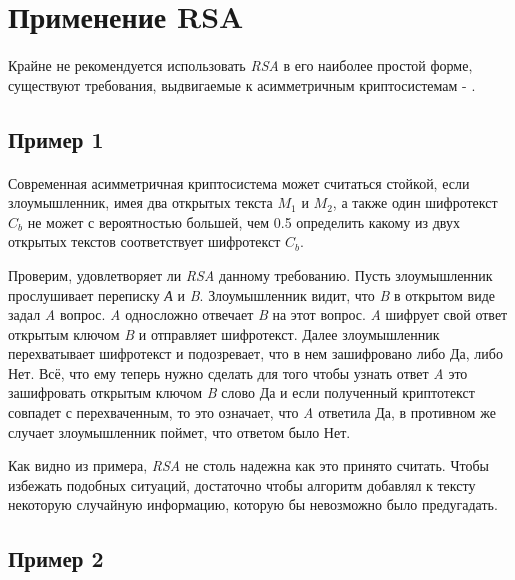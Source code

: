 \section{Применение RSA}

\paragraph{} Крайне не рекомендуется использовать \textit{RSA} в его наиболее простой форме, существуют требования, выдвигаемые к асимметричным криптосистемам
- \cite[страницы 329-331]{may10}.

\subsection{Пример 1}

\paragraph{} Современная асимметричная криптосистема может считаться стойкой, если злоумышленник, имея два открытых текста {$M_1$} и 
  {$M_2$}, а также один шифротекст {$C_b$} не может с вероятностью большей, чем 0.5 определить какому из двух 
  открытых текстов соответствует шифротекст {$C_b$}.

  Проверим, удовлетворяет ли \textit{RSA} данному требованию. Пусть злоумышленник прослушивает переписку \textit{А} и \textit{B}. Злоумышленник видит, что 
  \textit{B} в открытом виде задал \textit{A} вопрос. \textit{A} односложно отвечает \textit{B} на этот вопрос. \textit{A} шифрует свой ответ открытым ключом
  \textit{B} и отправляет шифротекст. Далее злоумышленник перехватывает шифротекст и подозревает, что в нем зашифровано либо Да, либо Нет. Всё, что ему 
  теперь нужно сделать для того чтобы узнать ответ \textit{A} это зашифровать открытым ключом \textit{B} слово Да и если полученный криптотекст совпадет 
  с перехваченным, то это означает, что \textit{A} ответила Да, в противном же случает злоумышленник поймет, что ответом было Нет.

  Как видно из примера, \textit{RSA} не столь надежна как это принято считать. Чтобы избежать подобных ситуаций, достаточно чтобы алгоритм добавлял к 
  тексту некоторую случайную информацию, которую бы невозможно было предугадать. 

\subsection{Пример 2}


